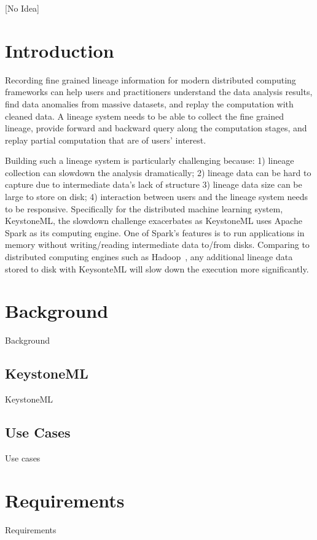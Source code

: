 \documentclass{sig-alternate}
\begin{document}
[No Idea]

\section{Introduction}
Recording fine grained lineage information for modern distributed computing frameworks can help
users and practitioners understand the data analysis results, find data anomalies from massive
datasets, and replay the computation with cleaned data. A lineage system needs to be able to collect the fine grained lineage, 
provide forward and backward query along the computation stages, and replay partial computation
that are of users' interest.

Building such a lineage system is particularly challenging because: 
1) lineage collection can slowdown the analysis dramatically;
2) lineage data can be hard to capture due to intermediate data's lack of structure
3) lineage data size can be large to store on disk; 
4) interaction between users and the lineage system needs to be responsive.
Specifically for the distributed machine learning system, KeystoneML, the slowdown challenge exacerbates as
KeystoneML uses Apache Spark as its computing engine. One of Spark's features is to run applications in memory
without writing/reading intermediate data to/from disks. Comparing to distributed computing engines such as Hadoop~\cite{HADOOP},
any additional lineage data stored to disk with KeysonteML will slow down the execution more significantly.


\section{Background}
\label{sec:Background}
Background

\subsection{KeystoneML}
KeystoneML

\subsection{Use Cases}
Use cases

\section{Requirements}
\label{sec:Req}
Requirements
\end{document}
